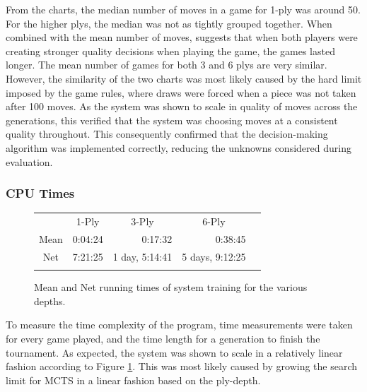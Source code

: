 \documentclass[12pt,a4paper]{article}
\begin{document}
            From the charts, the median number of moves in a game for 1-ply was around 50. 
            For the higher plys, the median was not as tightly grouped together. When combined with the mean number of moves, suggests that when both players were creating stronger quality decisions when playing the game, the games lasted longer. The mean number of games for both 3 and 6 plys are very similar. However, the similarity of the two charts was most likely caused by the hard limit imposed by the game rules, where draws were forced when a piece was not taken after 100 moves. 
            As the system was shown to scale in quality of moves across the generations, this verified that the system was choosing moves at a consistent quality throughout. This consequently confirmed that the decision-making algorithm was implemented correctly, reducing the unknowns considered during evaluation.

        \subsubsection{CPU Times}

        \begin{figure}[!ht]
            \centering
    
                \begin{tabular}{ccccc}
                       & 1-Ply        & 3-Ply          & 6-Ply          & \\ \cline{2-4}
                \multicolumn{1}{c|}{Mean} & \multicolumn{1}{r|}{0:04:24} & \multicolumn{1}{r|}{0:17:32}  & \multicolumn{1}{r|}{0:38:45}   & \\ \cline{2-4}
                \multicolumn{1}{c|}{Net} & \multicolumn{1}{r|}{7:21:25} & \multicolumn{1}{r|}{1 day, 5:14:41} & \multicolumn{1}{r|}{5 days, 9:12:25} & \\ \cline{2-4}
                       &          &           &            & 
                \end{tabular}
    
            \caption{Mean and Net running times of system training for the various depths. \label{cpu_table}}
            \end{figure}


            To measure the time complexity of the program, time measurements were taken for every game played, and the time length for a generation to finish the tournament. As expected, 
            the system was shown to scale in a relatively linear fashion according to Figure \ref{cpu_table}. This was most likely caused by growing the search limit for MCTS in a linear fashion based on the ply-depth.
\end{document}
